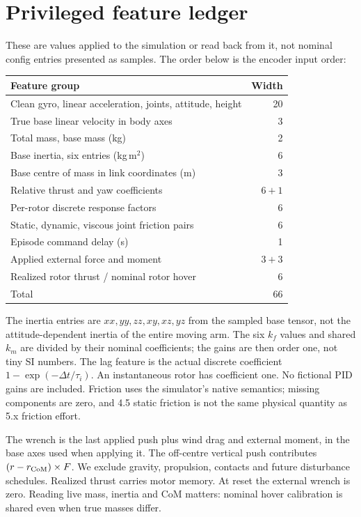 \documentclass[10pt,a4paper,twocolumn]{article}
\begin{document}
\section*{Privileged feature ledger}
These are values applied to the simulation or read back from it, not nominal config entries presented as samples. The order below is the encoder input order:
\begin{center}\small
\begin{tabular}{@{}lr@{}}
\toprule Feature group & Width\\\midrule
Clean gyro, linear acceleration, joints, attitude, height & 20\\
True base linear velocity in body axes & 3\\
Total mass, base mass (kg) & 2\\
Base inertia, six entries (kg\,m$^2$) & 6\\
Base centre of mass in link coordinates (m) & 3\\
Relative thrust and yaw coefficients & $6+1$\\
Per-rotor discrete response factors & 6\\
Static, dynamic, viscous joint friction pairs & 6\\
Episode command delay (s) & 1\\
Applied external force and moment & $3+3$\\
Realized rotor thrust / nominal rotor hover & 6\\\midrule
Total & 66\\\bottomrule
\end{tabular}
\end{center}
The inertia entries are $xx,yy,zz,xy,xz,yz$ from the sampled base tensor, not the attitude-dependent inertia of the entire moving arm. The six $k_f$ values and shared $k_m$ are divided by their nominal coefficients; the gains are then order one, not tiny SI numbers. The lag feature is the actual discrete coefficient $1-\exp(-\Delta t/\tau_i)$. An instantaneous rotor has coefficient one. No fictional PID gains are included. Friction uses the simulator's native semantics; missing components are zero, and 4.5 static friction is not the same physical quantity as 5.x friction effort.

The wrench is the last applied push plus wind drag and external moment, in the base axes used when applying it. The off-centre vertical push contributes $(r-r_{\rm CoM})\times F$. We exclude gravity, propulsion, contacts and future disturbance schedules. Realized thrust carries motor memory. At reset the external wrench is zero. Reading live mass, inertia and CoM matters: nominal hover calibration is shared even when true masses differ.
\end{document}
